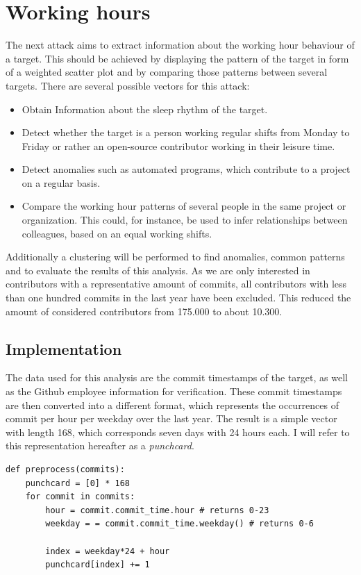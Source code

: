 \section{Working hours}

The next attack aims to extract information about the working hour behaviour of a target.
This should be achieved by displaying the pattern of the target in form of a weighted scatter plot and by comparing those patterns between several targets.
There are several possible vectors for this attack:

\begin{itemize}
    \item Obtain Information about the sleep rhythm of the target.
    \item Detect whether the target is a person working regular shifts from Monday to Friday or rather an open-source contributor working in their leisure time.
    \item Detect anomalies such as automated programs, which contribute to a project on a regular basis.
    \item Compare the working hour patterns of several people in the same project or organization. This could, for instance, be used to infer relationships between colleagues, based on an equal working shifts.
\end{itemize}

Additionally a clustering will be performed to find anomalies, common patterns and to evaluate the results of this analysis.
As we are only interested in contributors with a representative amount of commits, all contributors with less than one hundred commits in the last year have been excluded.
This reduced the amount of considered contributors from 175.000 to about 10.300.


\subsection{Implementation}\label{punchcard-implementation}

The data used for this analysis are the commit timestamps of the target, as well as the Github employee information for verification.
These commit timestamps are then converted into a different format, which represents the occurrences of commit per hour per weekday over the last year.
The result is a simple vector with length 168, which corresponds seven days with 24 hours each.
I will refer to this representation hereafter as a \emph{punchcard}.

\begin{verbatim}
def preprocess(commits):
    punchcard = [0] * 168
    for commit in commits:
        hour = commit.commit_time.hour # returns 0-23
        weekday = = commit.commit_time.weekday() # returns 0-6

        index = weekday*24 + hour
        punchcard[index] += 1

\end{verbatim}
\begingroup
{}\label{lst:puchcard-preprocessing}
\endgroup

